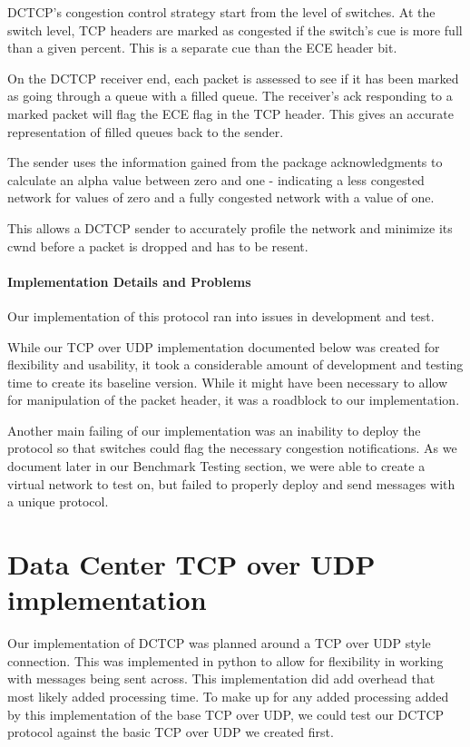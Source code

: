 \documentclass[%
 reprint,
amsmath,amssymb,
aps,
]{revtex4-2}
\begin{document}
DCTCP's congestion control strategy start from the level of switches. At the switch level, TCP headers are marked as congested if the switch's cue is more full than a given percent. This is a separate cue than the ECE header bit.

On the DCTCP receiver end, each packet is assessed to see if it has been marked as going through a queue with a filled queue. The receiver's ack responding to a marked packet will flag the ECE flag in the TCP header. This gives an accurate representation of filled queues back to the sender. 

The sender uses the information gained from the package acknowledgments to calculate an alpha value between zero and one - indicating a less congested network for values of zero and a fully congested network with a value of one. 

This allows a DCTCP sender to accurately profile the network and minimize its cwnd before a packet is dropped and has to be resent. 

\paragraph{Implementation Details and Problems}
Our implementation of this protocol ran into issues in development and test. 

While our TCP over UDP implementation documented below was created for flexibility and usability, it took a considerable amount of development and testing time to create its baseline version. While it might have been necessary to allow for manipulation of the packet header, it was a roadblock to our implementation.

Another main failing of our implementation was an inability to deploy the protocol so that switches could flag the necessary congestion notifications. As we document later in our Benchmark Testing section, we were able to create a virtual network to test on, but failed to properly deploy and send messages with a unique protocol.

\section{Data Center TCP over UDP implementation}
Our implementation of DCTCP was planned around a TCP over UDP style connection. This was implemented in python to allow for flexibility in working with messages being sent across. This implementation did add overhead that most likely added processing time. To make up for any added processing added by this implementation of the base TCP over UDP, we could test our DCTCP protocol against the basic TCP over UDP we created first.
 
\end{document}
